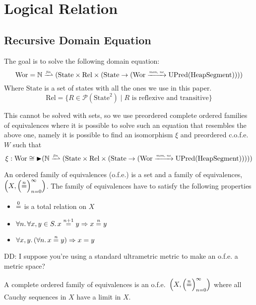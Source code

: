 \documentclass[a4paper]{article}
\newcommand{\finparfun}{\xrightharpoonup{\textit{\tiny{fin}}}}
\newcommand{\monnefun}{\xrightarrow{\textit{\tiny{mon, ne}}}}
\newcommand{\fun}{\rightarrow}
\newcommand{\nequal}[1][n]{\stackrel{\tiny{#1}}{=}}
\newcommand{\blater}{\mathop{\blacktriangleright}}
\newcommand{\powerset}[1]{\mathcal{P}(#1)}
\newcommand{\cofe}{c.o.f.e.}
\newcommand{\cofes}{\cofe{}'s}
\newcommand\dominique[1]{{\color{purple} \sf \footnotesize {DD: #1}}\\}
\newcommand{\plaindom}[1]{\mathrm{#1}}
\newcommand{\HeapSegments}{\plaindom{HeapSegment}}
\newcommand{\nats}{\mathbb{N}}
\newcommand{\Rel}{\plaindom{Rel}}
\newcommand{\States}{\plaindom{State}}
\newcommand{\Wor}{\plaindom{Wor}}
\newcommand{\UPred}[1]{\plaindom{UPred}(#1)}
\begin{document}
\section{Logical Relation}
\label{sec:logical-relation}
\subsection{Recursive Domain Equation}
\label{subsec:recursive-dom-eq}
The goal is to solve the following domain equation:
\[
\Wor = \nats \finparfun (\States \times \Rel \times (\States \fun (\Wor \monnefun \UPred{\HeapSegments})))
\]
Where $\States$ is a set of states with all the ones we use in this paper.
\[
\Rel= \{R \in \powerset{\States^2} \mid R \text{ is reflexive and transitive} \}
\]

This cannot be solved with sets, so we use preordered complete ordered families of equivalences where it is possible to solve such an equation that resembles the above one, namely it is possible to find an isomorphism $\xi$ and preordered \cofe{} $W$ such that
\[
  \xi : \Wor \cong \blater (\nats \finparfun (\States \times \Rel \times (\States \fun (\Wor \monnefun \UPred{\HeapSegments}))))
\]

\begin{definition}[o.f.e's]
  An ordered family of equivalences (o.f.e.) is a set and a family of equivalences, $\left(X, \left(\nequal\right)_{n=0}^{\infty} \right)$. The family of equivalences have to satisfy the following properties
  \begin{itemize}
  \item $\nequal[0]$ is a total relation on $X$
  \item $\forall n \ldotp \forall x,y \in S \ldotp x \nequal[n+1] y \Rightarrow x \nequal y$
  \item $\forall x,y \ldotp(\forall n \ldotp x \nequal y) \Rightarrow x=y$
  \end{itemize}
\end{definition}

\dominique{I suppose you're using a standard ultrametric metric to make an
  o.f.e. a metric space?}
\begin{definition}[\cofes]
  A complete ordered family of equivalences is an o.f.e.\ $\left(X, \left(\nequal\right)_{n=0}^{\infty} \right)$ where all Cauchy sequences in $X$ have a limit in $X$.
\end{definition}
\end{document}
